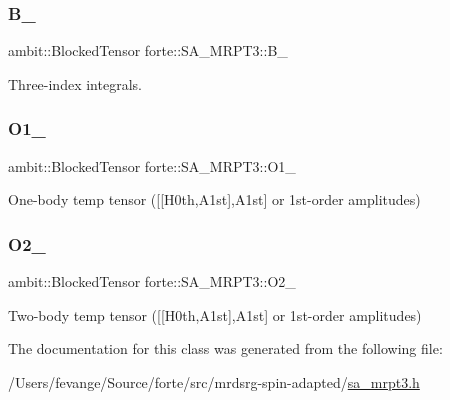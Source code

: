 \subsubsection{\texorpdfstring{B\+\_\+}{B\_}}
{\footnotesize\ttfamily ambit\+::\+Blocked\+Tensor forte\+::\+S\+A\+\_\+\+M\+R\+P\+T3\+::\+B\+\_\+\hspace{0.3cm}{\ttfamily [protected]}}



Three-\/index integrals. 

\mbox{\label{classforte_1_1_s_a___m_r_p_t3_a5b0747b050768825be3c5ff94adadfc9}} 
\subsubsection{\texorpdfstring{O1\+\_\+}{O1\_}}
{\footnotesize\ttfamily ambit\+::\+Blocked\+Tensor forte\+::\+S\+A\+\_\+\+M\+R\+P\+T3\+::\+O1\+\_\+\hspace{0.3cm}{\ttfamily [protected]}}



One-\/body temp tensor (\mbox{[}\mbox{[}H0th,A1st\mbox{]},A1st\mbox{]} or 1st-\/order amplitudes) 

\mbox{\label{classforte_1_1_s_a___m_r_p_t3_abd2d0c57869558eee2438f7ea31ac711}} 
\subsubsection{\texorpdfstring{O2\+\_\+}{O2\_}}
{\footnotesize\ttfamily ambit\+::\+Blocked\+Tensor forte\+::\+S\+A\+\_\+\+M\+R\+P\+T3\+::\+O2\+\_\+\hspace{0.3cm}{\ttfamily [protected]}}



Two-\/body temp tensor (\mbox{[}\mbox{[}H0th,A1st\mbox{]},A1st\mbox{]} or 1st-\/order amplitudes) 



The documentation for this class was generated from the following file\+:\begin{DoxyCompactItemize}
\item 
/\+Users/fevange/\+Source/forte/src/mrdsrg-\/spin-\/adapted/\mbox{\hyperlink{sa__mrpt3_8h}{sa\+\_\+mrpt3.\+h}}\end{DoxyCompactItemize}
